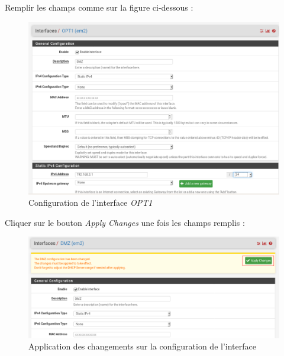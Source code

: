 \pagebreak
Remplir les champs comme sur la figure ci-dessous :
  \begin{figure}[h!]
     \begin{center}
         \includegraphics[scale=0.5]{Debian_screenshots/Config/11.png}
         \caption{Configuration de l'interface \textit{OPT1}}
         \label{Debian_screenshots/Config/11}
     \end{center}
  \end{figure}
  \FloatBarrier

\pagebreak
Cliquer sur le bouton \textit{Apply Changes} une fois les champs remplis :
  \begin{figure}[h!]
     \begin{center}
         \includegraphics[scale=0.5]{Debian_screenshots/Config/12.png}
         \caption{Application des changements sur la configuration de l'interface}
         \label{Debian_screenshots/Config/12}
     \end{center}
  \end{figure}
  \FloatBarrier
     
